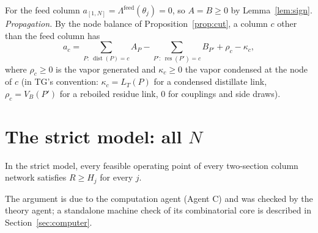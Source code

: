 \documentclass[11pt,a4paper]{report}
\newcommand{\Lam}{\Lambda}
\newcommand{\dist}{\operatorname{dist}}
\newcommand{\res}{\operatorname{res}}
\begin{document}
For the feed column $a_{[1,N]}=\Lam^{\mathrm{feed}}(\theta_j)=0$, so $A=B\ge0$ by Lemma~\ref{lem:sign}.
\emph{Propagation.} By the node balance of Proposition~\ref{prop:cut}, a column $c$ other than the feed column has
\begin{equation}\label{eq:prop}
a_c=\sum_{P:\ \dist(P)=c}A_P-\sum_{P':\ \res(P')=c}B_{P'}+\rho_c-\kappa_c,
\end{equation}
where $\rho_c\ge0$ is the vapor generated and $\kappa_c\ge0$ the vapor condensed at the node of $c$ (in TG's
convention: $\kappa_c=L_T(P)$ for a condensed distillate link, $\rho_c=V_B(P')$ for a reboiled residue link, $0$ for
couplings and side draws).

\section{The strict model: all \texorpdfstring{$N$}{N}}

\begin{theorem}\label{thm:strict}
In the strict model, every feasible operating point of every two-section column network satisfies $R\ge H_j$ for
every $j$.
\end{theorem}

The argument is due to the computation agent (Agent C) and was checked by the theory agent; a standalone
machine check of its combinatorial core is described in Section~\ref{sec:computer}.
\end{document}
